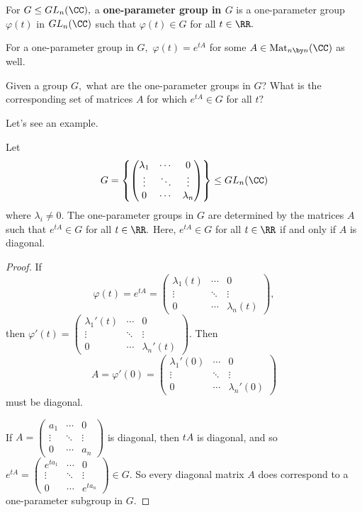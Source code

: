 \begin{definition}
For $G \leq GL_n(\CC),$ a \textbf{one-parameter group in $G$} is a one-parameter group $\varphi(t)$ in $GL_n(\CC)$ such that $\varphi(t) \in G$ for all $t \in \RR.$ 
\end{definition}

For a one-parameter group in $G,$ $\varphi(t) = e^{tA}$ for some $A \in \text{Mat}_{n \by n}(\CC)$ as well. 

\begin{qq}
Given a group $G,$ what are the one-parameter groups in $G$? What is the corresponding set of matrices $A$ for which $e^{tA} \in G$ for all $t?$ 
\end{qq}

Let's see an example.

\begin{example}
Let \[G = \left\{\begin{pmatrix} \lambda_1 & \cdots & 0 \\ \vdots & \ddots & \vdots \\ 0 & \cdots & \lambda_n \end{pmatrix} \right\} \leq GL_n(\CC)\] where $\lambda_i \neq 0.$ The one-parameter groups in $G$ are determined by the matrices $A$ such that $e^{tA} \in G$ for all $t \in \RR.$ Here, $e^{tA} \in G$ for all $t \in \RR$ if and only if $A$ is diagonal.
\end{example}

\begin{proof}
If \[\varphi(t) = e^{tA} = \begin{pmatrix} \lambda_1(t) & \cdots & 0 \\ \vdots & \ddots & \vdots \\ 0 & \cdots & \lambda_n(t) \end{pmatrix},\] then $\varphi'(t) = \begin{pmatrix} \lambda_1'(t) & \cdots & 0 \\ \vdots & \ddots & \vdots \\ 0 & \cdots & \lambda_n'(t) \end{pmatrix}$. Then \[A = \varphi'(0) = \begin{pmatrix} \lambda_1'(0) & \cdots & 0 \\ \vdots & \ddots & \vdots \\ 0 & \cdots & \lambda_n'(0) \end{pmatrix}\] must be diagonal. 

If $A = \begin{pmatrix} a_1 & \cdots & 0 \\ \vdots & \ddots & \vdots \\ 0 & \cdots & a_n \end{pmatrix}$ is diagonal, then $tA$ is diagonal, and so $e^{tA} = \begin{pmatrix} e^{ta_1} & \cdots & 0 \\ \vdots & \ddots & \vdots \\ 0 & \cdots & e^{ta_n} \end{pmatrix} \in G.$ So every diagonal matrix $A$ does correspond to a one-parameter subgroup in $G.$
\end{proof}


